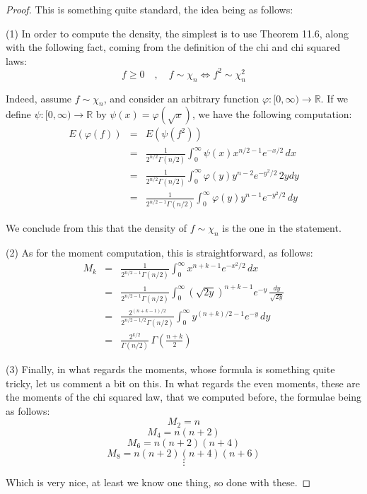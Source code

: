 \documentclass[12pt]{amsbook}
\begin{document}
\begin{proof}
This is something quite standard, the idea being as follows:

\medskip

(1) In order to compute the density, the simplest is to use Theorem 11.6, along with the following fact, coming from the definition of the chi and chi squared laws:
$$f\geq0\quad,\quad f\sim\chi_n\iff f^2\sim\chi_n^2$$

Indeed, assume $f\sim\chi_n$, and consider an arbitrary function $\varphi:[0,\infty)\to\mathbb R$. If we define $\psi:[0,\infty)\to\mathbb R$ by $\psi(x)=\varphi(\sqrt{x})$, we have the following computation:
\begin{eqnarray*}
E(\varphi(f))
&=&E(\psi(f^2))\\
&=&\frac{1}{2^{n/2}\Gamma(n/2)}\int_0^\infty\psi(x)x^{n/2-1}e^{-x/2}\,dx\\
&=&\frac{1}{2^{n/2}\Gamma(n/2)}\int_0^\infty\varphi(y)y^{n-2}e^{-y^2/2}\,2ydy\\
&=&\frac{1}{2^{n/2-1}\Gamma(n/2)}\int_0^\infty\varphi(y)y^{n-1}e^{-y^2/2}\,dy
\end{eqnarray*}

We conclude from this that the density of $f\sim\chi_n$ is the one in the statement.

\medskip

(2) As for the moment computation, this is straightforward, as follows:
\begin{eqnarray*}
M_k
&=&\frac{1}{2^{n/2-1}\Gamma(n/2)}\int_0^\infty x^{n+k-1}e^{-x^2/2}\,dx\\
&=&\frac{1}{2^{n/2-1}\Gamma(n/2)}\int_0^\infty\left(\sqrt{2y}\right)^{n+k-1}e^{-y}\,\frac{dy}{\sqrt{2y}}\\
&=&\frac{2^{(n+k-1)/2}}{2^{n/2-1/2}\Gamma(n/2)}\int_0^\infty y^{(n+k)/2-1}e^{-y}\,dy\\
&=&\frac{2^{k/2}}{\Gamma(n/2)}\,\Gamma\left(\frac{n+k}{2}\right)
\end{eqnarray*}

(3) Finally, in what regards the moments, whose formula is something quite tricky, let us comment a bit on this. In what regards the even moments, these are the moments of the chi squared law, that we computed before, the formulae being as follows:
$$M_2=n$$
$$M_4=n(n+2)$$
$$M_6=n(n+2)(n+4)$$
$$M_8=n(n+2)(n+4)(n+6)$$
$$\vdots$$

Which is very nice, at least we know one thing, so done with these.

\medskip


\end{proof}
\end{document}
